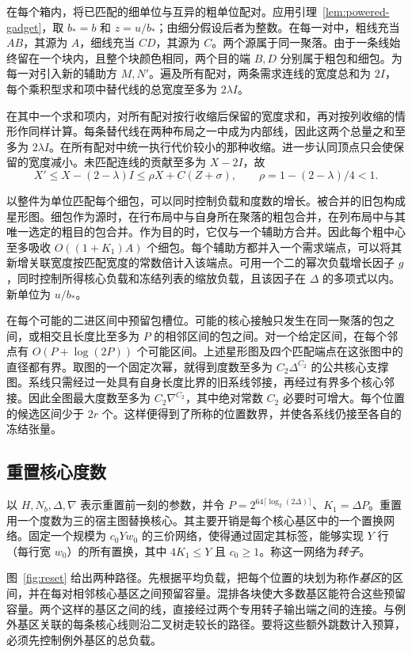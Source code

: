 在每个箱内，将已匹配的细单位与互异的粗单位配对。应用引理~\ref{lem:powered-gadget}，取 \(b_*=b\) 和 \(z=u/b_*\)；由细分假设后者为整数。在每一对中，粗线充当 \(AB\)，其源为 \(A\)，细线充当 \(CD\)，其源为 \(C\)。两个源属于同一聚落。由于一条线始终留在一个块内，且整个块颜色相同，两个目的端 \(B,D\) 分别属于粗包和细包。为每一对引入新的辅助方 \(M,N'\)。遍及所有配对，两条需求连线的宽度总和为 \(2I\)，每个乘积型求和项中替代线的总宽度至多为 \(2\lambda I\)。

在其中一个求和项内，对所有配对按行收缩后保留的宽度求和，再对按列收缩的情形作同样计算。每条替代线在两种布局之一中成为内部线，因此这两个总量之和至多为 \(2\lambda I\)。在所有配对中统一执行代价较小的那种收缩。进一步认同顶点只会使保留的宽度减小。未匹配连线的贡献至多为 \(X-2I\)，故 \[
 X'\le X-(2-\lambda)I\le\rho X+C(Z+\sigma),\qquad
 \rho=1-(2-\lambda)/4<1 .
\]

以整件为单位匹配每个细包，可以同时控制负载和度数的增长。被合并的旧包构成星形图。细包作为源时，在行布局中与自身所在聚落的粗包合并，在列布局中与其唯一选定的粗目的包合并。作为目的时，它仅与一个辅助方合并。因此每个粗中心至多吸收 \(O((1+K_1)A)\) 个细包。每个辅助方都并入一个需求端点，可以将其新增关联宽度按匹配宽度的常数倍计入该端点。可用一个二的幂次负载增长因子 \(g\)，同时控制所得核心负载和冻结列表的缩放负载，且该因子在 \(\Delta\) 的多项式以内。新单位为 \(u/b_*\)。

在每个可能的二进区间中预留包槽位。可能的核心接触只发生在同一聚落的包之间，或相交且长度比至多为 \(P\) 的相邻区间的包之间。对一个给定区间，在每个邻点有 \(O(P+\log(2P))\) 个可能区间。上述星形图及四个匹配端点在这张图中的直径都有界。取图的一个固定次幂，就得到度数至多为 \(C_2\Delta^{C_2}\) 的公共核心支撑图。系线只需经过一处具有自身长度比界的旧系线邻接，再经过有界多个核心邻接。因此全图最大度数至多为 \(C_2\nabla^{C_2}\)，其中绝对常数 \(C_2\) 必要时可增大。每个位置的候选区间少于 \(2r\) 个。这样便得到了所称的位置数界，并使各系线仍接至各自的冻结张量。

\subsection{重置核心度数}\label{subsec:reset} 以 \(H,N_b,\Delta,\nabla\) 表示重置前一刻的参数，并令 \(P=2^{64\lceil\log_2(2\Delta)\rceil}\)、\(K_1=\Delta P\)。重置用一个度数为三的宿主图替换核心。其主要开销是每个核心基区中的一个置换网络。固定一个规模为 \(c_0Yw_0\) 的三价网络，使得通过固定其标签，能够实现 \(Y\) 行（每行宽 \(w_0\)）的所有置换，其中 \(4K_1\le Y\) 且 \(c_0\ge1\)。称这一网络为\emph{转子}。

图~\ref{fig:reset} 给出两种路径。先根据平均负载，把每个位置的块划为称作\emph{基区}的区间，并在每对相邻核心基区之间预留容量。混排各块使大多数基区能符合这些预留容量。两个这样的基区之间的线，直接经过两个专用转子输出端之间的连接。与例外基区关联的每条核心线则沿二叉树走较长的路径。要将这些额外跳数计入预算，必须先控制例外基区的总负载。

